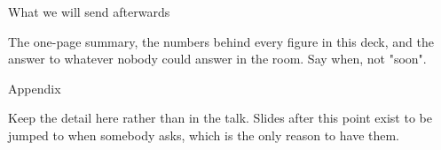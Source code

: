 
\begin{frame}{What we will send afterwards}
  \begin{glass}
  The one-page summary, the numbers behind every figure in this deck, and the answer to
  whatever nobody could answer in the room. Say when, not "soon".
  \end{glass}
\end{frame}

\begin{frame}{Appendix}
  \begin{glass}
  Keep the detail here rather than in the talk. Slides after this point exist to be jumped to
  when somebody asks, which is the only reason to have them.
  \end{glass}
\end{frame}
